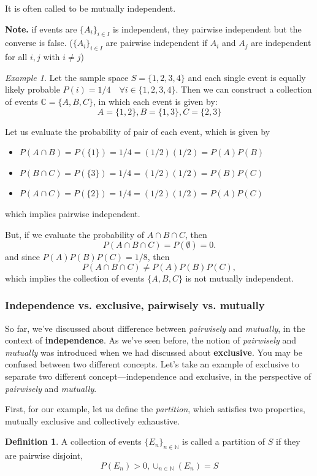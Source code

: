 \documentclass[twoside]{article}
\newcounter{lecnum}
\theoremstyle{definition}
\newtheorem{definition}{Definition}[section]
\theoremstyle{remark}
\newtheorem{example}{Example}[lecnum]
\begin{document}
It is often called to be mutually independent.

\textbf{Note.} if events are ${\{A_i\}}_{i \in I}$ is independent, they pairwise
independent but the converse is false. (${\{A_i\}}_{i \in I}$ are pairwise
independent if $A_i$ and $A_j$ are independent for all $i, j$ with $i \neq j$)

\begin{example}
  Let the sample space $S = \{1,2,3,4\}$ and each single event is equally likely
  probable $P(i) = 1/4 \quad \forall i \in \{ 1, 2, 3, 4 \}$. Then we can construct
  a collection of events $\mathbb{C} = {\{ A, B, C \}}$, in which each event is
  given by:
  $$
  A = \{ 1, 2 \}, B = \{ 1, 3 \}, C = \{ 2, 3 \}
  $$

  Let us evaluate the probability of pair of each event, which is given by
  \begin{itemize}
    \item $P(A \cap B) = P(\{ 1 \}) = 1/4 = (1/2)(1/2) = P(A)P(B)$
    \item $P(B \cap C) = P(\{ 3 \}) = 1/4 = (1/2)(1/2) = P(B)P(C)$
    \item $P(A \cap C) = P(\{ 2 \}) = 1/4 = (1/2)(1/2) = P(A)P(C)$
  \end{itemize}
  which implies pairwise independent.

  But, if we evaluate the probability of $A \cap B \cap C$, then
  $$
  P(A \cap B \cap C) = P(\emptyset) = 0.
  $$
  and since $P(A)P(B)P(C) = 1/8$, then
  $$
  P(A \cap B \cap C) \neq P(A)P(B)P(C),
  $$
  which implies the collection of events ${\{ A, B, C \}}$ is not mutually independent.
\end{example}

\subsubsection{Independence vs. exclusive, pairwisely vs. mutually}
So far, we've discussed about difference between \textit{pairwisely} and \textit{mutually},
in the context of \textbf{independence}. As we've seen before, the notion of
\textit{pairwisely} and \textit{mutually} was introduced when we had discussed
about \textbf{exclusive}. You may be confused between two different concepts.
Let's take an example of exclusive to separate two different concept---independence
and exclusive, in the perspective of \textit{pairwisely} and \textit{mutually}.

First, for our example, let us define the \textit{partition}, which satisfies
two properties, mutually exclusive and collectively exhaustive.
\begin{definition}
  A collection of events ${\{ E_n \}}_{n \in \mathbb{N}}$ is called a partition
  of $S$ if they are pairwise disjoint,
  $$
  P(E_n) > 0, \cup_{n\in \mathbb{N}}(E_n) = S
  $$
\end{definition}
\end{document}
